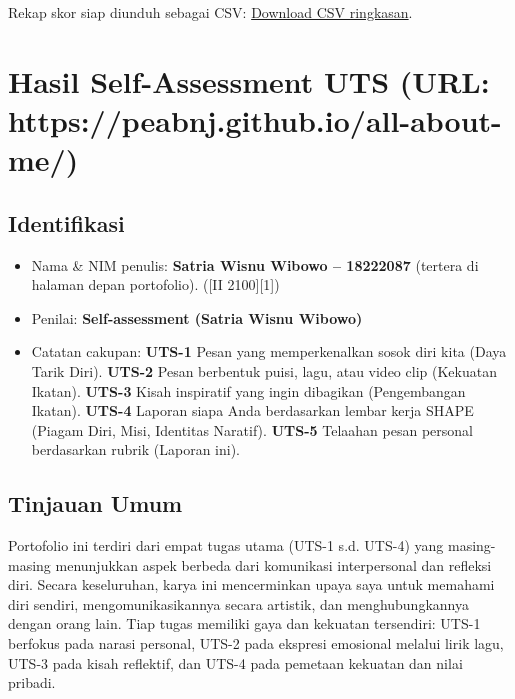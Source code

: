 \documentclass[
  letterpaper,
  DIV=11,
  numbers=noendperiod]{scrreprt}
\providecommand{\tightlist}{%
  \setlength{\itemsep}{0pt}\setlength{\parskip}{0pt}}
\begin{document}
Rekap skor siap diunduh sebagai CSV:
\href{https://drive.google.com/uc?export=download&id=1ltdijxNsITAzwXbkyjWIUYM4L9Oge6cG}{Download
CSV ringkasan}.


\chapter{Hasil Self-Assessment UTS (URL:
https://peabnj.github.io/all-about-me/)}\label{hasil-self-assessment-uts-url-httpspeabnj.github.ioall-about-me}

\section{Identifikasi}\label{identifikasi}

\begin{itemize}
\tightlist
\item
  Nama \& NIM penulis: \textbf{Satria Wisnu Wibowo -- 18222087} (tertera
  di halaman depan portofolio). ({[}II 2100{]}{[}1{]})
\item
  Penilai: \textbf{Self-assessment (Satria Wisnu Wibowo)}
\item
  Catatan cakupan: \textbf{UTS-1} Pesan yang memperkenalkan sosok diri
  kita (Daya Tarik Diri). \textbf{UTS-2} Pesan berbentuk puisi, lagu,
  atau video clip (Kekuatan Ikatan). \textbf{UTS-3} Kisah inspiratif
  yang ingin dibagikan (Pengembangan Ikatan). \textbf{UTS-4} Laporan
  siapa Anda berdasarkan lembar kerja SHAPE (Piagam Diri, Misi,
  Identitas Naratif). \textbf{UTS-5} Telaahan pesan personal berdasarkan
  rubrik (Laporan ini).
\end{itemize}

\section{Tinjauan Umum}\label{tinjauan-umum}

Portofolio ini terdiri dari empat tugas utama (UTS-1 s.d. UTS-4) yang
masing-masing menunjukkan aspek berbeda dari komunikasi interpersonal
dan refleksi diri. Secara keseluruhan, karya ini mencerminkan upaya saya
untuk memahami diri sendiri, mengomunikasikannya secara artistik, dan
menghubungkannya dengan orang lain. Tiap tugas memiliki gaya dan
kekuatan tersendiri: UTS-1 berfokus pada narasi personal, UTS-2 pada
ekspresi emosional melalui lirik lagu, UTS-3 pada kisah reflektif, dan
UTS-4 pada pemetaan kekuatan dan nilai pribadi.
\end{document}
